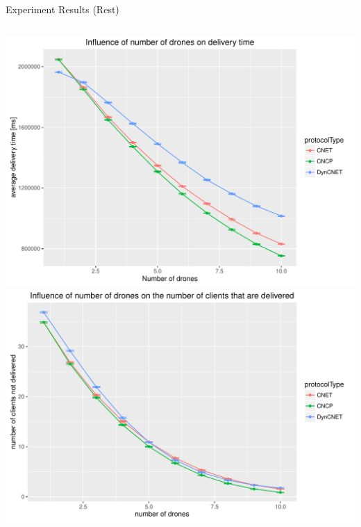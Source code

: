 \documentclass[notes]{beamer}
\begin{document}
	\begin{frame}{Experiment Results (Rest)}
		\begin{columns}	
			\begin{center}	
				\includegraphics[height=0.4\textheight]{drones-deliverytime}\\
				\includegraphics[height=0.4\textheight]{drones-delivered}
			\end{center}
		

\end{columns}
\end{frame}
\end{document}
